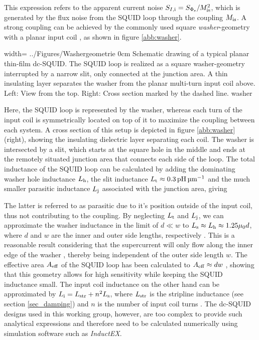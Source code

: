 
This expression refers to the apparent current noise $S_{I\rm ,i}=S_{\rm \Phi_s}/M_{\rm is}^2$, which is generated by the flux noise from the SQUID loop through the coupling $M_{\rm is}$. A strong coupling can be achieved by the commonly used square \textit{washer}-geometry with a planar input coil \cite{Jay1981}, as shown in figure \ref{abb:washer}. 

{width=\textwidth}
{../Figures/Washergeometrie}
{0cm}   %
{Schematic drawing of a typical planar thin-film dc-SQUID. The SQUID loop is realized as a square washer-geometry interrupted by a narrow slit, only connected at the junction area. A thin insulating layer separates the washer from the planar multi-turn input coil above. Left: View from the top. Right: Cross section marked by the dashed line.}
{washer}

Here, the SQUID loop is represented by the washer, whereas each turn of the input coil is symmetrically located on top of it to maximize the coupling between each system. A cross section of this setup is depicted in figure \ref{abb:washer} (right), showing the insulating dielectric layer separating each coil. The washer is intersected by a slit, which starts at the square hole in the middle and ends at the remotely situated junction area that connects each side of the loop. The total inductance of the SQUID loop can be calculated by adding the dominating washer hole inductance $L_{\rm h}$, the slit inductance $L_{\rm t}\approx \qty{0.3}{\pH\per\um}$ and the much smaller parasitic inductance $L_{\rm j}$ associated with the junction area, giving \cite{Ketchen1991}


The latter is referred to as parasitic due to it's position outside of the input coil, thus not contributing to the coupling. By neglecting $L_{\rm t}$ and $L_{\rm j}$, we can approximate the washer inductance in the limit of $d\ll w$ to $L_{\rm s}\approx L_{\rm h}\approx 1.25{\rm\mu_0}d$, where $d$ and $w$ are the inner and outer side lengths, respectively \cite{Ketchen1981}. This is a reasonable result considering that the supercurrent will only flow along the inner edge of the washer \cite{Ketchen1982}, thereby being independent of the outer side length $w$. The effective area $A_{\rm eff}$ of the SQUID loop has been calculated to $A_{\rm eff}\approx dw$ \cite{Ketchen1985}, showing that this geometry allows for high sensitivity while keeping the SQUID inductance small. The input coil inductance on the other hand can be approximated by $L_{\rm i}=L_{\rm str}+n^2L_{\rm s}$, where $L_{\rm str}$ is the stripline inductance (see section \ref{sec_damping}) and $n$ is the number of input coil turns \cite{Ketchen1981}. The dc-SQUID designs used in this working group, however, are too complex to provide such analytical expressions and therefore need to be calculated numerically using simulation software such as \textit{InductEX}. 

